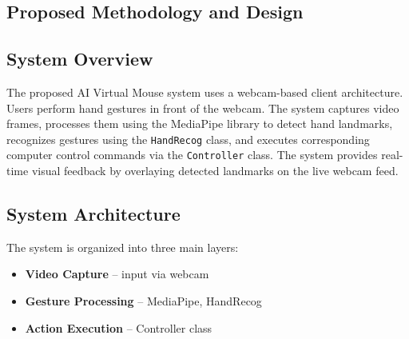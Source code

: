 \documentclass[12pt,a4paper]{report}
\begin{document}
\begin{enumerate}
\chapter{Proposed Methodology and Design}

\section{System Overview}

The proposed AI Virtual Mouse system uses a webcam-based client architecture. Users perform hand
gestures in front of the webcam. The system captures video frames, processes them using the
MediaPipe library to detect hand landmarks, recognizes gestures using the \texttt{HandRecog}
class, and executes corresponding computer control commands via the \texttt{Controller} class.
The system provides real-time visual feedback by overlaying detected landmarks on the live
webcam feed.

\section{System Architecture}

The system is organized into three main layers:
\begin{itemize}[noitemsep]
  \item \textbf{Video Capture} -- input via webcam
  \item \textbf{Gesture Processing} -- MediaPipe, HandRecog
  \item \textbf{Action Execution} -- Controller class
\end{itemize}


\end{enumerate}
\end{document}
